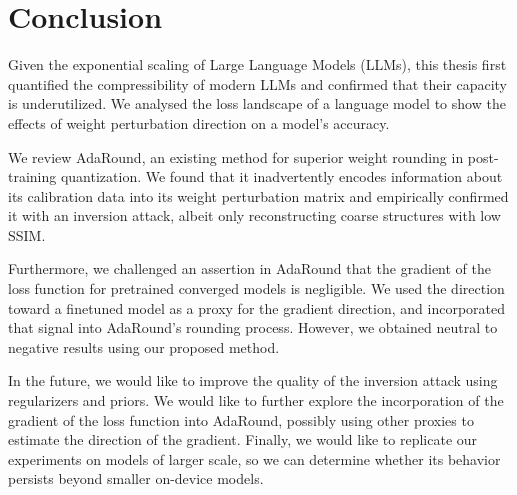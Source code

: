\documentclass[../main.tex]{subfiles}
\begin{document}
\chapter{Conclusion} \label{chap:conclusion}
Given the exponential scaling of Large Language Models (LLMs), this thesis first quantified the compressibility of modern LLMs and confirmed that their capacity is underutilized. We analysed the loss landscape of a language model to show the effects of weight perturbation direction on a model's accuracy.

We review AdaRound, an existing method for superior weight rounding in post-training quantization. We found that it inadvertently encodes information about its calibration data into its weight perturbation matrix and empirically confirmed it with an inversion attack, albeit only reconstructing coarse structures with low SSIM.

Furthermore, we challenged an assertion in AdaRound that the gradient of the loss function for pretrained converged models is negligible. We used the direction toward a finetuned model as a proxy for the gradient direction, and incorporated that signal into AdaRound's rounding process. However, we obtained neutral to negative results using our proposed method.

In the future, we would like to improve the quality of the inversion attack using regularizers and priors. We would like to further explore the incorporation of the gradient of the loss function into AdaRound, possibly using other proxies to estimate the direction of the gradient. Finally, we would like to replicate our experiments on models of larger scale, so we can determine whether its behavior persists beyond smaller on-device models.
\end{document}
